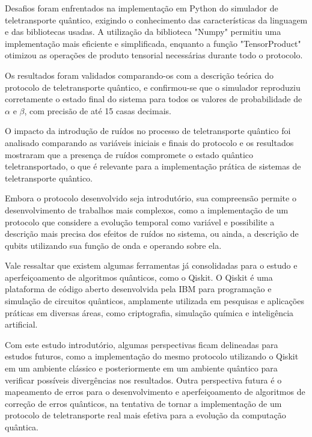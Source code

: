 Desafios foram enfrentados na implementação em Python do simulador de teletransporte quântico, exigindo o conhecimento das características da linguagem e das bibliotecas usadas. A utilização da biblioteca "Numpy" permitiu uma implementação mais eficiente e simplificada, enquanto a função "TensorProduct" otimizou as operações de produto tensorial necessárias durante todo o protocolo.

Os resultados foram validados comparando-os com a descrição teórica do protocolo de teletransporte quântico, e confirmou-se que o simulador reproduziu corretamente o estado final do sistema para todos os valores de probabilidade de $\alpha$ e $\beta$, com precisão de até 15 casas decimais.

O impacto da introdução de ruídos no processo de teletransporte quântico foi analisado comparando as variáveis iniciais e finais do protocolo e os resultados mostraram que a presença de ruídos compromete o estado quântico teletransportado, o que é relevante para a implementação prática de sistemas de teletransporte quântico.

Embora o protocolo desenvolvido seja introdutório, sua compreensão permite o desenvolvimento de trabalhos mais complexos, como a implementação de um protocolo que considere a evolução temporal como variável e possibilite a descrição mais precisa dos efeitos de ruídos no sistema, ou ainda, a descrição de qubits utilizando sua função de onda e operando sobre ela.

Vale ressaltar que existem algumas ferramentas já consolidadas para o estudo e aperfeiçoamento de algoritmos quânticos, como o Qiskit. O Qiskit é uma plataforma de código aberto desenvolvida pela IBM para programação e simulação de circuitos quânticos, amplamente utilizada em pesquisas e aplicações práticas em diversas áreas, como criptografia, simulação química e inteligência artificial.

Com este estudo introdutório, algumas perspectivas ficam delineadas para estudos futuros, como a implementação do mesmo protocolo utilizando o Qiskit em um ambiente clássico e posteriormente em um ambiente quântico para verificar possíveis divergências nos resultados. Outra perspectiva futura é o mapeamento de erros para o desenvolvimento e aperfeiçoamento de algoritmos de correção de erros quânticos, na tentativa de tornar a implementação de um protocolo de teletransporte real mais efetiva para a evolução da computação quântica.


 




